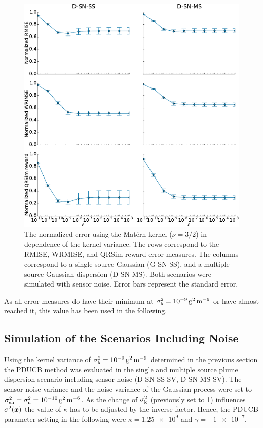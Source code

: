 \begin{figure}
    \centering
    \includegraphics{plots/kvar}
    \caption[Normalized error in dependence of the kernel process variance]{The 
        normalized error using the Mat\'ern kernel ($\nu = 3/2$) in dependence 
        of the kernel variance.  The rows correspond to the RMISE, WRMISE, and 
        QRSim reward error measures.  The columns correspond to a single source 
        Gaussian (G-SN-SS), and a multiple source Gaussian dispersion (D-SN-MS).  
        Both scenarios were simulated with sensor noise.  Error bars represent 
        the standard error.}\label{fig:kvar}
\end{figure}

As all error measures do have their minimum at $\sigma\ped{k}^2 
= \SI{1e-9}{\gram\squared\per\meter\tothe{6}}$ or have almost reached it, this 
value has been used in the following.

\subsection{Simulation of the Scenarios Including Noise}
Using the kernel variance of $\sigma\ped{k}^2 
= \SI{1e-9}{\gram\squared\per\meter\tothe{6}}$ determined in the previous 
section the PDUCB method was evaluated in the single and multiple source plume 
dispersion scenario including sensor noise (D-SN-SS-SV, D-SN-MS-SV). The sensor 
noise variance and the noise variance of the Gaussian process were set to 
$\sigma\ped{sn}^2 = \sigma\ped{n}^2 
= \SI{1e-10}{\gram\squared\per\meter\tothe{6}}$.  As the change of 
$\sigma_{\mathrm{k}}^2$ (previously set to 1) influences $\sigma^2(\bm{x})$ the value 
of $\kappa$ has to be adjusted by the inverse factor. Hence, the PDUCB parameter 
setting in the following were $\kappa = \num{1.25e9}$ and $\gamma 
= \num{-1e-7}$.

